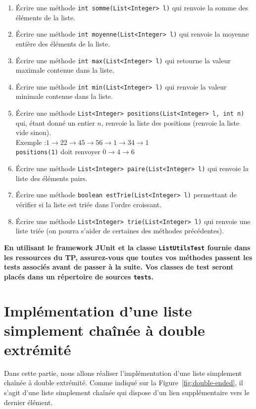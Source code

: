 \documentclass[iutinfo,a4paper,nocorrections,10pt]{ustl-tdtp}
\begin{document}
\begin{enumerate}
\item Écrire une méthode \texttt{int somme(List<Integer> l)} qui renvoie la somme des éléments de la liste.
\item Écrire une méthode \texttt{int moyenne(List<Integer> l)} qui renvoie la moyenne entière des éléments de la liste.
\item Écrire une méthode \texttt{int max(List<Integer> l)} qui retourne la valeur maximale contenue dans la liste.
\item Écrire une méthode \texttt{int min(List<Integer> l)} qui renvoie la valeur minimale contenue dans la liste.
\item Écrire une méthode \texttt{List<Integer> positions(List<Integer> l, int n)} qui, étant donné un entier $n$, renvoie la liste des positions (renvoie la liste vide sinon).\\
Exemple :$1 \rightarrow 22 \rightarrow 45 \rightarrow 56 \rightarrow 1 \rightarrow 34 \rightarrow 1$\\
\texttt{positions(1)} doit renvoyer $0 \rightarrow 4 \rightarrow 6$
\item Écrire une méthode \texttt{List<Integer> paire(List<Integer> l)} qui renvoie la liste des éléments pairs.
\item Écrire une méthode \texttt{boolean estTrie(List<Integer> l)} permettant de vérifier si la liste est triée dans l'ordre croissant.
\item Écrire une méthode \texttt{List<Integer> trie(List<Integer> l)} qui renvoie une liste triée (on pourra s'aider de certaines des méthodes précédentes).
\end{enumerate}

\textbf{En utilisant le framework JUnit et la classe \texttt{ListUtilsTest} fournie dans les ressources du TP, assurez-vous que toutes vos méthodes passent les tests associés avant de passer à la suite. Vos classes de test seront placés dans un répertoire de sources \texttt{tests}.}

\section{Implémentation d'une liste simplement chaînée à double extrémité}

Dans cette partie, nous allons réaliser l'implémentation d'une liste simplement chaînée à double extrémité. Comme indiqué sur la Figure~\ref{fig:double-ended}, il s'agit d'une liste simplement chaînée qui dispose d'un lien supplémentaire vers le dernier élément. 
\end{document}
